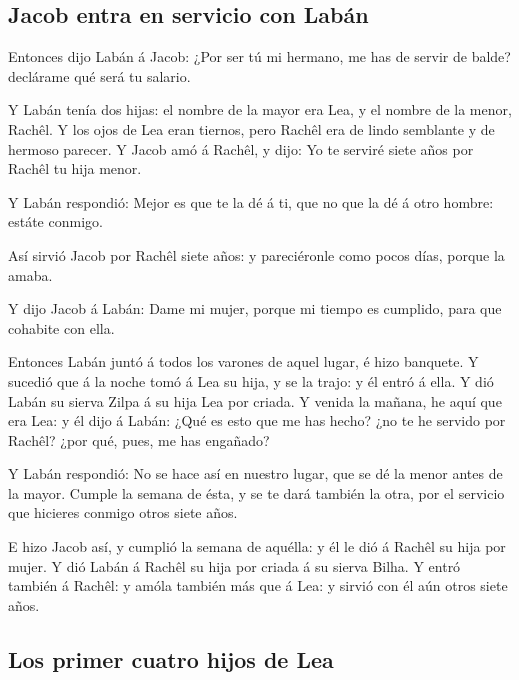 \hypertarget{jacob-entra-en-servicio-con-labuxe1n}{%
\subsection{Jacob entra en servicio con
Labán}\label{jacob-entra-en-servicio-con-labuxe1n}}

 Entonces dijo Labán á Jacob: ¿Por ser tú mi hermano, me
has de servir de balde? declárame qué será tu salario.

 Y Labán tenía dos hijas: el nombre de la mayor era Lea,
y el nombre de la menor, Rachêl.  Y los ojos de Lea eran
tiernos, pero Rachêl era de lindo semblante y de hermoso parecer.
 Y Jacob amó á Rachêl, y dijo: Yo te serviré siete años
por Rachêl tu hija menor.

 Y Labán respondió: Mejor es que te la dé á ti, que no
que la dé á otro hombre: estáte conmigo.

 Así sirvió Jacob por Rachêl siete años: y pareciéronle
como pocos días, porque la amaba.

 Y dijo Jacob á Labán: Dame mi mujer, porque mi tiempo es
cumplido, para que cohabite con ella.

 Entonces Labán juntó á todos los varones de aquel lugar,
é hizo banquete.  Y sucedió que á la noche tomó á Lea su
hija, y se la trajo: y él entró á ella.  Y dió Labán su
sierva Zilpa á su hija Lea por criada.  Y venida la
mañana, he aquí que era Lea: y él dijo á Labán: ¿Qué es esto que me has
hecho? ¿no te he servido por Rachêl? ¿por qué, pues, me has engañado?

 Y Labán respondió: No se hace así en nuestro lugar, que
se dé la menor antes de la mayor.  Cumple la semana de
ésta, y se te dará también la otra, por el servicio que hicieres conmigo
otros siete años.

 E hizo Jacob así, y cumplió la semana de aquélla: y él
le dió á Rachêl su hija por mujer.  Y dió Labán á Rachêl
su hija por criada á su sierva Bilha.  Y entró también á
Rachêl: y amóla también más que á Lea: y sirvió con él aún otros siete
años.

\hypertarget{los-primer-cuatro-hijos-de-lea}{%
\subsection{Los primer cuatro hijos de
Lea}\label{los-primer-cuatro-hijos-de-lea}}

